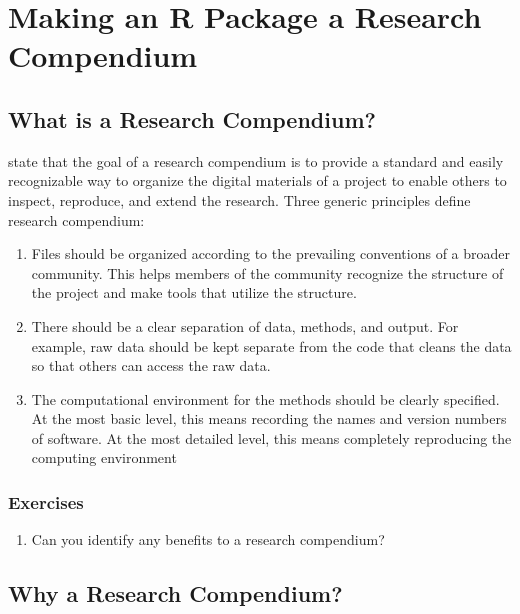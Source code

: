 \documentclass[
]{book}
\providecommand{\tightlist}{%
  \setlength{\itemsep}{0pt}\setlength{\parskip}{0pt}}
\begin{document}
\hypertarget{r-package-rc}{%
\chapter{Making an R Package a Research Compendium}\label{r-package-rc}}

\hypertarget{what-is-a-rc}{%
\section{What is a Research Compendium?}\label{what-is-a-rc}}

\citet{marwick2018packaging} state that the goal of a research compendium is to provide a standard and easily recognizable way to organize the digital materials of a project to enable others to inspect, reproduce, and extend the research. Three generic principles define research compendium:

\begin{enumerate}
\def\labelenumi{\arabic{enumi}.}
\item
  Files should be organized according to the prevailing conventions of a broader community. This helps members of the community recognize the structure of the project and make tools that utilize the structure.
\item
  There should be a clear separation of data, methods, and output. For example, raw data should be kept separate from the code that cleans the data so that others can access the raw data.
\item
  The computational environment for the methods should be clearly specified. At the most basic level, this means recording the names and version numbers of software. At the most detailed level, this means completely reproducing the computing environment
\end{enumerate}

\hypertarget{ex-set6}{%
\subsection{Exercises}\label{ex-set6}}

\begin{enumerate}
\def\labelenumi{\arabic{enumi}.}
\tightlist
\item
  Can you identify any benefits to a research compendium?
\end{enumerate}

\hypertarget{why-a-rc}{%
\section{Why a Research Compendium?}\label{why-a-rc}}
\end{document}
